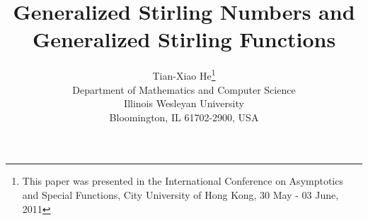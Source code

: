 \newcommand\bC{{\mathbb C}}
\newcommand\bR{{\mathbb R}}
\newcommand\bN{{\mathbb N}}
\newcommand\bQ{{\mathbb Q}}
\newcommand\bZ{{\mathbb Z}}
\newcommand\bT{{\mathbb T}}
\newcommand\bF{{\mathbb F}}

\newcommand\Cs{{{\mathbb C}^s}}
\newcommand\Rs{{{\mathbb R}^s}}
\newcommand\Ns{{{\mathbb N}^s}}
\newcommand\Zs{{{\mathbb Z}^s}}
\newcommand\Ts{{{\mathbb T}^s}}

\newcommand\cA{{\cal A}}
\newcommand\cB{{\cal B}}
\newcommand\cD{{\cal D}}
\newcommand\F{{\cal F}}
\newcommand\cR{{\cal R}}
\newcommand\cN{{\cal N}}
\newcommand\cO{{\cal O}}
\newcommand\cQ{{\cal Q}}
\newcommand\cZ{{\cal Z}}
\newcommand\cH{{\cal H}}

\newcommand\Ga{{\Gamma}}
\newcommand\ga{{\gamma}}
\newcommand\ep{{\epsilon}}

\newcommand\tu{{\bigtriangleup}}
\newcommand\td{{\bigtriangledown}}

\newcommand{\NS}{\mbox{\scriptsize${\mathbb{N}}$}}
\newcommand{\SEP}{\ \Bigm|\ }
\newcommand{\de}{\mbox{\rm d}}
\newcommand{\EQ}[1]{\mbox{$\stackrel{\ \small #1}{=}\ $}}
\def\Gf#1{\G\left( #1\right)}
\def\matrice#1{\left(#1_{n,k}\right)_{n,k\in \NS}}
\def\insieme#1{\left\{#1\right\}}
\def\sequ#1{\left(#1_k\right)_{k\in \NS}}
\def\stdue#1#2{\left\{{#1\atop#2}\right\}}
\def\stuno#1#2{\left[{#1\atop#2}\right]}

\def\eop{\hfill\rule{2.0mm}{2.0mm}}
\def\thefootnote{}
\def\divdif{\mathord\kern.43em\vrule width.6pt height5.6pt depth-.28pt \kern-.43em\Delta}

%
\def\d{{\rm d}}
\def\a{\alpha}
\def\l{\lambda}

\title{
Generalized Stirling Numbers and Generalized Stirling Functions
}

\author{ %
Tian-Xiao He\footnote{This paper was presented in the International Conference on Asymptotics and Special Functions, City University of Hong Kong,
30 May - 03 June, 2011}\\
{\small Department of Mathematics and Computer Science }\\
{\small Illinois Wesleyan University}\\
{\small Bloomington, IL 61702-2900, USA}\\
}

